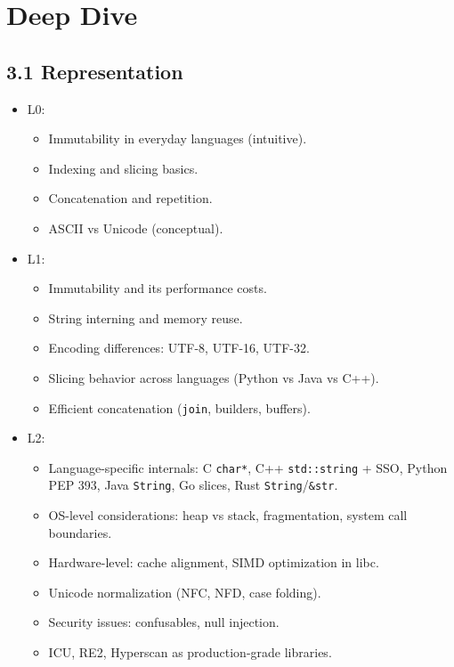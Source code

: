 \documentclass[
  letterpaper,
  DIV=11,
  numbers=noendperiod]{scrreprt}
\providecommand{\tightlist}{%
  \setlength{\itemsep}{0pt}\setlength{\parskip}{0pt}}
\begin{document}
\section{Deep Dive}\label{deep-dive-37}

\subsection{3.1 Representation}\label{representation-2}

\begin{itemize}
\item
  L0:

  \begin{itemize}
  \tightlist
  \item
    Immutability in everyday languages (intuitive).
  \item
    Indexing and slicing basics.
  \item
    Concatenation and repetition.
  \item
    ASCII vs Unicode (conceptual).
  \end{itemize}
\item
  L1:

  \begin{itemize}
  \tightlist
  \item
    Immutability and its performance costs.
  \item
    String interning and memory reuse.
  \item
    Encoding differences: UTF-8, UTF-16, UTF-32.
  \item
    Slicing behavior across languages (Python vs Java vs C++).
  \item
    Efficient concatenation (\texttt{join}, builders, buffers).
  \end{itemize}
\item
  L2:

  \begin{itemize}
  \tightlist
  \item
    Language-specific internals: C \texttt{char*}, C++
    \texttt{std::string} + SSO, Python PEP 393, Java \texttt{String}, Go
    slices, Rust \texttt{String}/\texttt{\&str}.
  \item
    OS-level considerations: heap vs stack, fragmentation, system call
    boundaries.
  \item
    Hardware-level: cache alignment, SIMD optimization in libc.
  \item
    Unicode normalization (NFC, NFD, case folding).
  \item
    Security issues: confusables, null injection.
  \item
    ICU, RE2, Hyperscan as production-grade libraries.
  \end{itemize}
\end{itemize}
\end{document}
